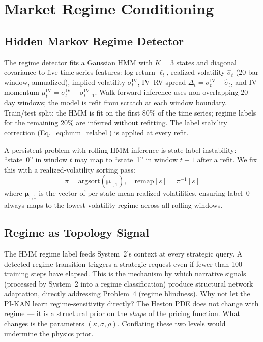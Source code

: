 \documentclass[11pt,a4paper]{article}
\begin{document}
\section{Market Regime Conditioning}
\label{sec:regime}

\subsection{Hidden Markov Regime Detector}
\label{sec:regime:hmm}

The regime detector fits a Gaussian HMM with $K=3$ states and diagonal covariance to
five time-series features: log-return $\ell_t$, realized volatility $\hat{\sigma}_t$
(20-bar window, annualized), implied volatility $\sigma^\text{IV}_t$, IV--RV spread
$\Delta_t = \sigma^\text{IV}_t - \hat{\sigma}_t$, and IV momentum
$\mu^\text{IV}_t = \sigma^\text{IV}_t - \sigma^\text{IV}_{t-1}$.
Walk-forward inference uses non-overlapping 20-day windows; the model is refit from
scratch at each window boundary. Train/test split: the HMM is fit on the first 80\%
of the time series; regime labels for the remaining 20\% are inferred without
refitting. The label stability correction (Eq.~\ref{eq:hmm_relabel}) is applied at
every refit.

A persistent problem with rolling HMM inference is state label instability: ``state~0''
in window $t$ may map to ``state~1'' in window $t+1$ after a refit. We fix this with
a realized-volatility sorting pass:
\begin{equation}
\pi = \text{argsort}(\bm{\mu}_{:,1}), \quad \text{remap}[s] = \pi^{-1}[s]
\label{eq:hmm_relabel}
\end{equation}
where $\bm{\mu}_{:,1}$ is the vector of per-state mean realized volatilities, ensuring
label~0 always maps to the lowest-volatility regime across all rolling windows.

\subsection{Regime as Topology Signal}
\label{sec:regime:signal}

The HMM regime label feeds System~2's context at every strategic query. A detected
regime transition triggers a strategic request even if fewer than 100 training steps
have elapsed. This is the mechanism by which narrative signals (processed by System~2
into a regime classification) produce structural network adaptation, directly addressing
Problem~4 (regime blindness). Why not let the PI-KAN learn regime-sensitivity directly?
The Heston PDE does not change with regime --- it is a structural prior on the
\emph{shape} of the pricing function. What changes is the parameters
$(\kappa, \sigma, \rho)$. Conflating these two levels would undermine the physics prior.
\end{document}
